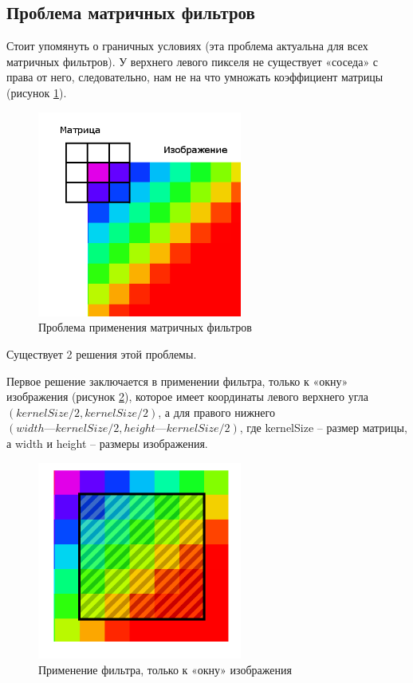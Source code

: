 \subsection{Проблема матричных фильтров}

Стоит упомянуть о граничных условиях (эта проблема актуальна для всех матричных фильтров). У верхнего левого пикселя не существует «соседа» с права от него, следовательно, нам не на что умножать коэффициент матрицы (рисунок \ref{fig:spire16}).

\begin{figure}[hbtp]
	\centering
	\includegraphics[width=0.6\textwidth]{img/image8.png}
	\caption{\label{fig:spire16} Проблема применения матричных фильтров}
\end{figure}

Существует 2 решения этой проблемы.


Первое решение заключается в применении фильтра, только к «окну» изображения (рисунок \ref{fig:spire17}), которое имеет координаты левого верхнего угла \newline $(kernelSize / 2, kernelSize / 2)$, а для правого нижнего \newline $(width — kernelSize / 2, height — kernelSize / 2)$, где kernelSize – размер матрицы, а width и height – размеры изображения.

\begin{figure}[hbtp]
	\centering
	\includegraphics[width=0.6\textwidth]{img/image9.png}
	\caption{\label{fig:spire17} Применение фильтра, только к «окну» изображения}
\end{figure}


